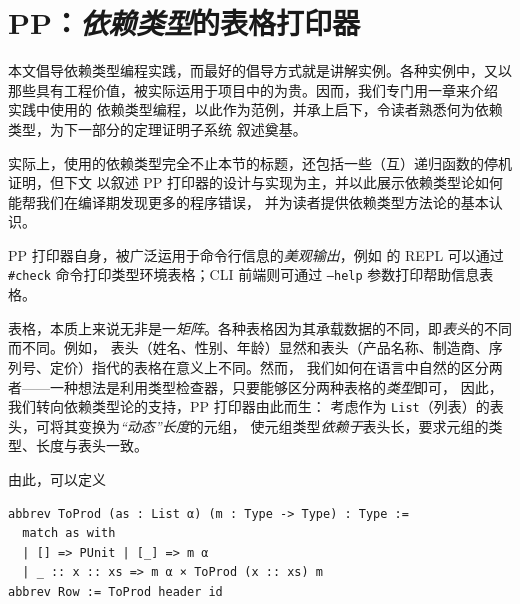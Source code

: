 \chapter{PP：\emph{依赖类型}的表格打印器}
本文倡导依赖类型编程实践，而最好的倡导方式就是讲解实例。各种实例中，又以
那些具有工程价值，被实际运用于项目中的为贵。因而，我们专门用一章来介绍 \Tigris 实践中使用的
依赖类型编程，以此作为范例，并承上启下，令读者熟悉何为依赖类型，为下一部分的定理证明子系统 \Tigrisd 叙述奠基。

实际上，\Tigris 使用的依赖类型完全不止本节的标题，还包括一些（互）递归函数的停机证明，但下文
以叙述 PP 打印器的设计与实现为主，并以此展示依赖类型论如何能帮我们在编译期发现更多的程序错误，
并为读者提供依赖类型方法论的基本认识。

PP 打印器自身，被广泛运用于命令行信息的\emph{美观输出}，例如
\Tigris 的 REPL 可以通过 \texttt{\#check} 命令打印类型环境表格；CLI 前端则可通过
\texttt{--help} 参数打印帮助信息表格。
\vspace{-.6cm}
\begin{analysis}
  表格，本质上来说无非是一\emph{矩阵}。各种表格因为其承载数据的不同，即\emph{表头}的不同而不同。例如，
  表头（姓名、性别、年龄）显然和表头（产品名称、制造商、序列号、定价）指代的表格在意义上不同。然而，
  我们如何在语言中自然的区分两者——一种想法是利用类型检查器，只要能够区分两种表格的\emph{类型}即可，
  因此，我们转向依赖类型论的支持，PP 打印器由此而生：
  考虑作为 \texttt{List}（列表）的表头，可将其变换为\emph{“动态”长度}的元组，
  使元组类型\emph{依赖于}表头长，要求元组的类型、长度与表头一致。

  \hphantom{空格} 由此，可以定义
\end{analysis}
\begin{verbatim}
abbrev ToProd (as : List α) (m : Type -> Type) : Type :=
  match as with
  | [] => PUnit | [_] => m α
  | _ :: x :: xs => m α × ToProd (x :: xs) m
abbrev Row := ToProd header id
\end{verbatim}

